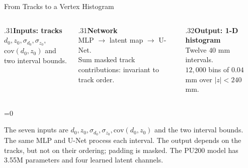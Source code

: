 \documentclass[xcolor=table,aspectratio=169]{beamer}
\providecommand{\talkbuild}{0}
\newcommand{\readingonly}[1]{\ifnum\talkbuild=0\relax#1\fi}
\newcommand{\readingnote}[1]{\readingonly{\par\vspace{.35em}%
  {\footnotesize\color{black!65}#1\par}}}
\begin{document}
\begin{frame}{From Tracks to a Vertex Histogram}
\begin{columns}[t]
\begin{column}{.31\linewidth}\textbf{Inputs: tracks}\\[.5em]\small
$d_0,z_0,\sigma_{d_0},\sigma_{z_0},$\\[.3em]
$\mathrm{cov}(d_0,z_0)$ and two interval bounds.
\end{column}
\begin{column}{.31\linewidth}\textbf{Network}\\[.5em]\small
MLP $\to$ latent map $\to$ U-Net.\\[.5em]
Sum masked track contributions: invariant to track order.
\end{column}
\begin{column}{.32\linewidth}\textbf{Output: 1-D histogram}\\[.5em]\small
Twelve $40$ mm intervals.\\[.4em]
$12{,}000$ bins of $0.04$ mm over $|z|<240$ mm.
\end{column}\end{columns}\readingnote{The seven inputs are $d_0,z_0,\sigma_{d_0},\sigma_{z_0},\mathrm{cov}(d_0,z_0)$ and the two interval bounds. The same MLP and U-Net process each interval. The output depends on the tracks, but not on their ordering; padding is masked. The PU200 model has 3.55M parameters and four learned latent channels.}
\end{frame}
\end{document}

